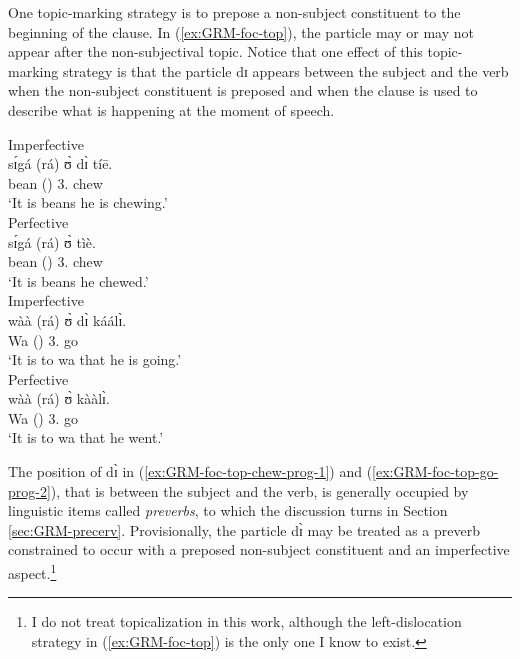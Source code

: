 \begin{exe}
\begin{exe}
\begin{exe}
\begin{exe}
\begin{exe}
\begin{exe}
\begin{exe}
\begin{exe}
\begin{exe}
\begin{exe}
\begin{exe}
One topic-marking strategy is to prepose a non-subject constituent to the beginning of the clause.  In  (\ref{ex:GRM-foc-top}),  the  particle may or may not appear after the non-subjectival topic. Notice that one effect of this topic-marking strategy is that the particle {\sls dɪ} appears between the subject and the verb when the non-subject constituent is preposed and when the clause is used to describe what is happening at the moment of speech. \nolinebreak

\ea\label{ex:GRM-foc-top}
 \ea\label{ex:GRM-foc-top-chew-prog-1}{\rm Imperfective}\\
\gll  sɪ́gá (rá)  ʊ̀ dɪ̀  tíē.\\
 bean  ({\foc}) {3.\sg} {\ipfv} chew\\
\glt `It is {\sc beans} he is chewing.'\\


 \ex\label{ex:GRM-foc-top-chew-perf-1}{\rm Perfective}\\
\gll  sɪ́gá (rá) ʊ̀   tìè.\\
 bean  ({\foc}) {3.\sg}  chew\\
\glt `It is {\sc beans} he chewed.'\\




 \ex\label{ex:GRM-foc-top-go-prog-2}{\rm Imperfective}\\
\gll   wàà (rá) ʊ̀ dɪ̀  káálɪ̀.\\
Wa ({\foc}) {3.\sg} {\ipfv} go\\
\glt `It is to {\sc wa} that he is going.'\\


 \ex\label{ex:GRM-foc-top-go-perf-2}{\rm Perfective}\\
\gll   wàà (rá)  ʊ̀ kààlɪ̀.\\
Wa   ({\foc}) {3.\sg}  go\\
\glt `It is to {\sc wa} that he went.'\\
\z 
 \z

The position of {\sls dɪ̀} in  (\ref{ex:GRM-foc-top-chew-prog-1}) and (\ref{ex:GRM-foc-top-go-prog-2}), that is between the subject and the verb, is generally occupied by linguistic items called  {\it preverbs},  to which the discussion turns in Section \ref{sec:GRM-precerv}.  Provisionally, the particle {\sls dɪ̀} may be treated as a preverb constrained to occur with  a preposed  non-subject constituent and an imperfective aspect.\footnote{I do not treat topicalization in this work, although the left-dislocation strategy in (\ref{ex:GRM-foc-top}) is the only one I know to exist.}



\end{exe}
\end{exe}
\end{exe}
\end{exe}
\end{exe}
\end{exe}
\end{exe}
\end{exe}
\end{exe}
\end{exe}
\end{exe}
